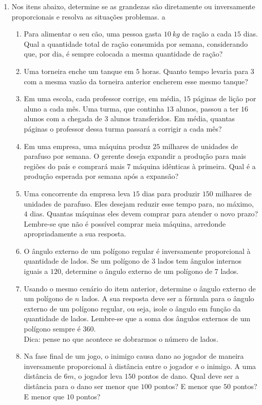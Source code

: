 \documentclass[12pt]{report}
\newcommand{\1}{\faThermometerEmpty}
\newcommand{\2}{\faThermometerQuarter}
\newcommand{\3}{\faThermometerHalf}
\newcommand{\4}{\faThermometerThreeQuarters}
\newcommand{\5}{\faThermometerFull}
\begin{document}
\begin{enumerate}
\item Nos itens abaixo, determine se as grandezas são diretamente ou inversamente proporcionais e resolva as situações problemas. \1 a \3
\begin{enumerate}
\item Para alimentar o seu cão, uma pessoa gasta $10\ kg$ de ração a cada $15$ dias. Qual a quantidade total de ração consumida por semana, considerando que, por dia, é sempre colocada a mesma quantidade de ração?  
\item Uma torneira enche um tanque em $5$ horas. Quanto tempo levaria para $3$ com a mesma vazão da torneira anterior  encherem esse mesmo tanque?
\item Em uma escola, cada professor corrige, em média, $15$ páginas de lição por aluno a cada mês. Uma turma, que continha $13$ alunos, passou a ter $16$ alunos com a chegada de $3$ alunos transferidos. Em média, quantas páginas o professor dessa turma passará a corrigir a cada mês?
\item Em uma empresa, uma máquina produz $25$ milhares de unidades de parafuso por semana. O gerente deseja expandir a produção para mais regiões do país e comprará mais $7$ máquina idênticas à primeira. Qual é a produção esperada por semana após a expansão?
\item Uma concorrente da empresa leva $15$ dias para produzir $150$ milhares de unidades de parafuso. Eles desejam reduzir esse tempo para, no máximo, $4$ dias. Quantas máquinas eles devem comprar para atender o novo prazo? Lembre-se que não é possível comprar meia máquina, arredonde apropriadamente a sua resposta.
\item O ângulo externo de um polígono regular é inversamente proporcional à quantidade de lados. Se um polígono de $3$ lados tem ângulos internos iguais a $120 $\textdegree, determine o ângulo externo de um polígono de $7$ lados.
\item \3 Usando o mesmo cenário do item anterior, determine o ângulo externo de um polígono de $n$ lados. A sua resposta deve ser a fórmula para o ângulo externo de um polígono regular, ou seja, isole o ângulo em função da quantidade de lados. Lembre-se que a soma dos ângulos externos de um polígono sempre é 360\textdegree.
\\ Dica: pense no que acontece se dobrarmos o número de lados.
\item Na fase final de um jogo, o inimigo causa dano ao jogador de maneira inversamente proporcional à distância entre o jogador e o inimigo. A uma distância de $6m$, o jogador leva $150$ pontos de dano. Qual deve ser a distância para o dano ser menor que $100$ pontos? E menor que $50$ pontos? E menor que $10$ pontos?

\end{enumerate}
\end{enumerate}
\end{document}
